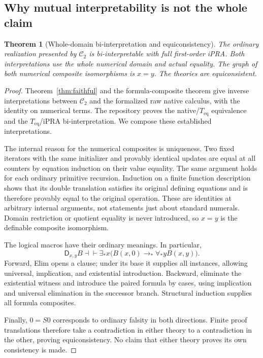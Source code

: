 \documentclass[11pt]{article}
\newtheorem{theorem}{Theorem}[section]
\theoremstyle{definition}\newtheorem{definition}[theorem]{Definition}
\newcommand{\Ctwo}{\mathcal C_2}
\newcommand{\D}{\mathsf D}
\newcommand{\Teq}{T_{\mathrm{eq}}}
\newcommand{\iffder}{\mathrel{\dashv\vdash}}
\begin{document}
\subsection{Why mutual interpretability is not the whole claim}

\begin{theorem}[Whole-domain bi-interpretation and equiconsistency]
The ordinary realization presented by $\Ctwo$ is bi-interpretable
with full first-order iPRA. Both interpretations use the whole
numerical domain and actual equality. The graph of both numerical
composite isomorphisms is $x=y$. The theories are equiconsistent.
\end{theorem}
\begin{proof}
Theorem~\ref{thm:faithful} and the formula-composite theorem give
inverse interpretations between $\Ctwo$ and the formalized raw
native calculus, with the identity on numerical terms. The repository
proves the native/$\Teq$ equivalence and the $\Teq$/iPRA
bi-interpretation. We compose these established interpretations.

The internal reason for the numerical composites is uniqueness.
Two fixed iterators with the same initializer and provably identical
updates are equal at all counters by equation induction on their
value equality. The same argument holds for each ordinary primitive
recursion. Induction on a finite function description shows that its
double translation satisfies its original defining equations and is
therefore provably equal to the original operation. These are
identities at arbitrary internal arguments, not statements just about
standard numerals. Domain restriction or quotient equality is never
introduced, so $x=y$ is the definable composite isomorphism.

The logical macros have their ordinary meanings. In particular,
\[
 \D_{x,y}B\iffder
 \exists_*x\bigl(B(x,0)\to_*\forall_*yB(x,y)\bigr).
\]
Forward, Elim opens a clause; under its base it supplies all instances,
allowing universal, implication, and existential introduction.
Backward, eliminate the existential witness and introduce the paired
formula by cases, using implication and universal elimination in the
successor branch. Structural induction supplies all formula composites.

Finally, $0=S0$ corresponds to ordinary falsity in both directions.
Finite proof translations therefore take a contradiction in either
theory to a contradiction in the other, proving equiconsistency.
No claim that either theory proves its own consistency is made.
\end{proof}
\end{document}
